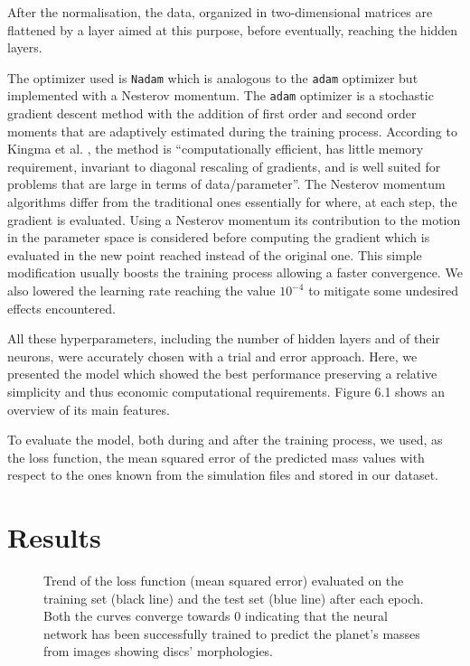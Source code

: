 \documentclass[a4paper,10pt]{report}
\begin{document}
After the normalisation, the data, organized in two-dimensional matrices are flattened by a layer aimed at this purpose, before
eventually, reaching the hidden layers.

The optimizer used is \lstinline{Nadam} which is analogous to the \lstinline{adam} optimizer but implemented with a Nesterov momentum.
The \lstinline{adam} optimizer is a stochastic gradient descent method with the addition of first order and second order moments
that are adaptively estimated during the training process. According to
 Kingma et al. \cite{nadam},
 the method is ``computationally efficient, has little memory requirement, 
 invariant to diagonal rescaling of gradients, 
 and is well suited for problems that are large in terms of data/parameter''.
The Nesterov momentum algorithms differ from the traditional ones essentially for where, at each step, the gradient is evaluated.
Using a Nesterov momentum its contribution to the motion in the parameter space is considered before computing the gradient 
which is evaluated in the new point reached instead of the original one. This simple modification usually boosts the training process allowing
a faster convergence.
We also lowered the learning rate reaching the value $10^{-4}$ to mitigate some undesired effects encountered.

All these hyperparameters, including the number of hidden layers and of their neurons, were accurately chosen
with a trial and error approach. Here, we presented the model which showed the best performance preserving a relative simplicity
and thus economic computational requirements. 
Figure 6.1 shows an overview of its main features.

To evaluate the model, both during and after the training process, we used, as the loss function, the mean squared error of the predicted mass values 
with respect to the ones known from the simulation files and stored in our dataset.

\section{Results}

\begin{figure}
    \begin{center}
        
    \end{center}
    \caption{Trend of the loss function (mean squared error) 
    evaluated on the training set (black line) and the test set (blue line)
    after each epoch. Both the curves converge towards 0
    indicating that the neural network has been successfully trained to predict the planet's masses 
    from images showing discs' morphologies. }
\end{figure}
\end{document}
